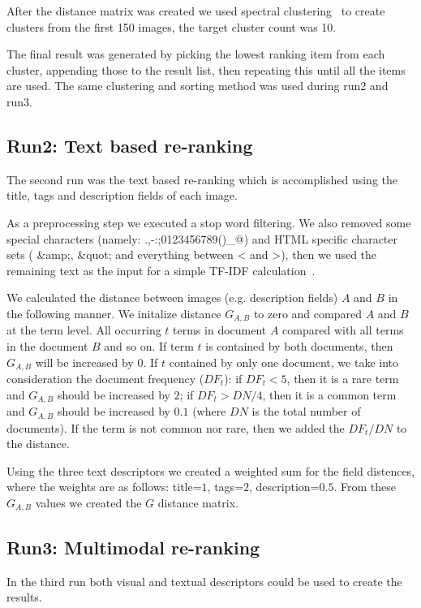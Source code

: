 \documentclass{acm_proc_article-me}
\begin{document}
After the distance matrix was created we used spectral clustering~\cite{Ma2009,Ng01onspectral} to create clusters from the first 150 images, the target cluster count was 10. 

The final result was generated by picking the lowest ranking item from each cluster, appending those to the result list, then repeating this until all the items are used. The same clustering and sorting method was used during run2 and run3.

\subsection{Run2: Text based re-ranking}\label{run2}
The second run was the text based re-ranking which is accomplished using the title, tags and description fields of each image.

As a preprocessing step we executed a stop word filtering. We also removed some special characters (namely: .,-:;0123456789()\_@) and HTML specific character sets ( \&amp;, \&quot; and everything between < and >), then we used the remaining text as the input for a simple TF-IDF calculation~\cite{Yeh2008}. 

 We calculated the distance between images (e.g. description fields) $A$ and $B$ in the following manner. We initalize distance $G_{A,B}$ to zero and compared $A$ and $B$ at the term level. All occurring $t$ terms in document $A$ compared with all terms in the document $B$ and so on. If term $t$ is contained by both documents, then $G_{A,B}$ will be increased by $0$. If $t$ contained by only one document, we take into consideration the document frequency ($DF_t$): if $DF_t<5$, then it is a rare term and $G_{A,B}$ should be increased by $2$; if $DF_t>DN/4$, then it is a common term and  $G_{A,B}$ should be increased by $0.1$ (where $DN$ is the total number of documents). If the term is not common nor rare, then we added the $DF_t/DN$ to the distance. 
 
Using the three text descriptors we created a weighted sum for the field distences, where the weights are as follows: title=$1$, tags=$2$, description=$0.5$. From these $G_{A,B}$ values we created the $G$ distance matrix.

\subsection{Run3: Multimodal re-ranking}
In the third run both visual and textual descriptors could be used to create the results.
\end{document}
